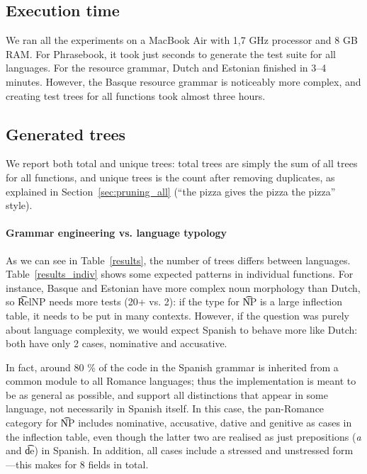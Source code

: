 
\subsection{Execution time} We ran all the experiments on a MacBook Air
with 1,7 GHz processor and 8 GB RAM. For Phrasebook, it took just
seconds to generate the test suite for all languages. For the resource
grammar, Dutch and Estonian finished in 3--4 minutes. However, the
Basque resource grammar is noticeably more complex, and creating test
trees for all functions took almost three hours.

\subsection{Generated trees}

We report both total and unique trees: total trees are simply the sum
of all trees for all functions, and unique trees is the count after
removing duplicates, as explained in Section~\ref{sec:pruning_all}
(``the pizza gives the pizza the pizza'' style).

\paragraph{Grammar engineering vs. language typology}
As we can see in Table~\ref{results}, the number of trees differs between
languages. Table~\ref{results_indiv} shows some expected patterns in
individual functions. For instance, Basque and Estonian have more
complex noun morphology than Dutch, so \t{RelNP} needs more tests (20+
vs. 2): if the type for \t{NP} is a large inflection table, it needs
to be put in many contexts. However, if the question was purely about
language complexity, we would expect Spanish to behave more like
Dutch: both have only 2 cases, nominative and accusative. 

In fact, around 80 \% of the code in the Spanish grammar is inherited
from a common module to all Romance languages; thus the implementation
is meant to be as general as possible, and support all distinctions
that appear in some language, not necessarily in Spanish itself. In
this case, the pan-Romance category for \t{NP} includes nominative,
accusative, dative and genitive as cases in the inflection table, even
though the latter two are realised as just prepositions (\emph{a} and
\t{de}) in Spanish. In addition, all cases include a stressed and
unstressed form---this makes for 8 fields in total.

